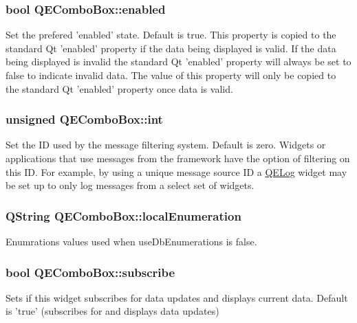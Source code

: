 \hypertarget{classQEComboBox_a0e38f748ae89b5b0a9d28ceb60f892a3}{
\subsubsection[{enabled}]{\setlength{\rightskip}{0pt plus 5cm}bool QEComboBox::enabled}}
\label{classQEComboBox_a0e38f748ae89b5b0a9d28ceb60f892a3}
Set the prefered 'enabled' state. Default is true. This property is copied to the standard Qt 'enabled' property if the data being displayed is valid. If the data being displayed is invalid the standard Qt 'enabled' property will always be set to false to indicate invalid data. The value of this property will only be copied to the standard Qt 'enabled' property once data is valid. \hypertarget{classQEComboBox_a1effaba9e0a9e69b0d4fa83eaa64ec22}{
\subsubsection[{int}]{\setlength{\rightskip}{0pt plus 5cm}unsigned QEComboBox::int}}
\label{classQEComboBox_a1effaba9e0a9e69b0d4fa83eaa64ec22}
Set the ID used by the message filtering system. Default is zero. Widgets or applications that use messages from the framework have the option of filtering on this ID. For example, by using a unique message source ID a \hyperlink{classQELog}{QELog} widget may be set up to only log messages from a select set of widgets. \hypertarget{classQEComboBox_a3a1601a6a26ba3df3f730974a7002ed8}{
\subsubsection[{localEnumeration}]{\setlength{\rightskip}{0pt plus 5cm}QString QEComboBox::localEnumeration}}
\label{classQEComboBox_a3a1601a6a26ba3df3f730974a7002ed8}
Enumrations values used when useDbEnumerations is false. \hypertarget{classQEComboBox_af1bedb9843c0b2181dfcd432d2b41a5c}{
\subsubsection[{subscribe}]{\setlength{\rightskip}{0pt plus 5cm}bool QEComboBox::subscribe}}
\label{classQEComboBox_af1bedb9843c0b2181dfcd432d2b41a5c}
Sets if this widget subscribes for data updates and displays current data. Default is 'true' (subscribes for and displays data updates) 

